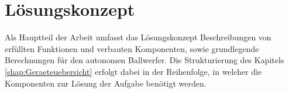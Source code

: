 \section{Lösungskonzept}
Als Hauptteil der Arbeit umfasst das Lösungskonzept Beschreibungen von erfüllten Funktionen und verbauten Komponenten, sowie 
grundlegende Berechnungen für den autonomen Ballwerfer. Die Strukturierung des Kapitels \ref{shap:Geraeteuebersicht} erfolgt dabei in der Reihenfolge, in welcher die Komponenten zur Lösung der Aufgabe benötigt werden.